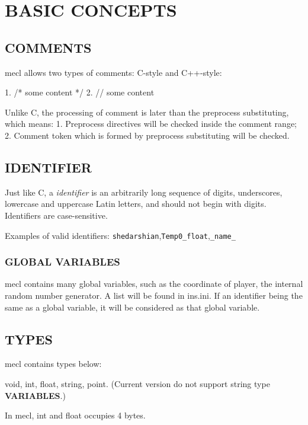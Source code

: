 \documentclass{article}
\begin{document}
\section{BASIC CONCEPTS}

\subsection{COMMENTS}

mecl allows two types of comments: C-style and C++-style:

\begin{MUAvbt}
1. /* some content */
2. // some content \n
\end{MUAvbt}

Unlike C, the processing of comment is later than the preprocess substituting, which means: 1. Preprocess directives will be checked inside the comment range; 2. Comment token which is formed by preprocess substituting will be checked.

\subsection{IDENTIFIER}

Just like C, a \textit{identifier} is an arbitrarily long sequence of digits, underscores, lowercase and uppercase Latin letters, and should not begin with digits. Identifiers are case-sensitive.

Examples of valid identifiers: \verb|shedarshian|,\verb|Temp0_float|,\verb|_name_|

\subsubsection{GLOBAL VARIABLES}

mecl contains many global variables, such as the coordinate of player, the internal random number generator. A list will be found in ins.ini. If an identifier being the same as a global variable, it will be considered as that global variable.

\subsection{TYPES}

mecl contains types below:

void, int, float, string, point. (Current version do not support string type \textbf{VARIABLES}.)

In mecl, int and float occupies 4 bytes.
\end{document}
